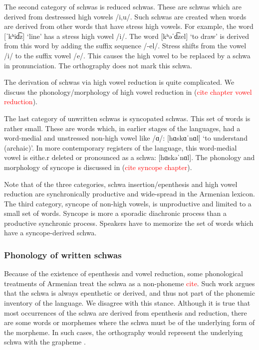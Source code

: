    	The second category of schwas is reduced schwas. These are schwas which are derived from destressed high vowels /i,u/. Such schwas are created when words are derived from other words that have stress high vowels. For example, the word [ˈkʰid͡z] `line' has a stress high vowel /i/. The word [kʰəˈd͡zel] `to draw' is derived from this word by adding the suffix sequence /-el/. Stress shifts from the vowel /i/ to the suffix vowel /e/. This causes the high vowel to be replaced by a schwa in pronunciation. The orthography does not mark this schwa. 
   	
   	The derivation of schwas via high vowel reduction is quite complicated. We discuss the phonology/morphology of high vowel reduction in (\textcolor{red}{cite chapter vowel reduction}). 
   	
   	The last category of unwritten schwas is syncopated schwas. This set of words is rather small. These are words which, in earlier stages of the languages, had a word-medial and unstressed non-high vowel like /ɑ/: [hɑskɑˈnɑl] `to understand (archaic)'. In more contemporary registers of the language, this word-medial vowel is eithe.r deleted or pronounced as a schwa: [hɑskəˈnɑl]. The phonology and morphology of syncope is discussed in (\textcolor{red}{cite syncope chapter}). 
   	
   	Note that of the three categories, schwa insertion/epenthesis and high vowel reduction are synchronically productive and wide-spread in the Armenian lexicon. The third category, syncope of non-high vowels, is unproductive and limited to a small set of words. Syncope is more a sporadic diachronic process than a productive synchronic process. Speakers have to memorize the set of words which have a syncope-derived schwa.
   	
   	\subsubsection{Phonology of written schwas}\label{section:segmentalPhono:vowel:schwa:written}
   	
   	Because of the existence of epenthesis and vowel reduction, some phonological treatments of Armenian treat the schwa as a non-phoneme \textcolor{red}{cite}. Such work argues that the schwa is always epenthetic or derived, and thus not part of the phonemic inventory of the language. We disagree with this stance. Although it is true that most occurrences of the schwa are derived from epenthesis and reduction, there are some words or morphemes where the schwa must be of the underlying form of the morpheme. In such cases, the orthography would represent the underlying schwa with the grapheme . 
   	
